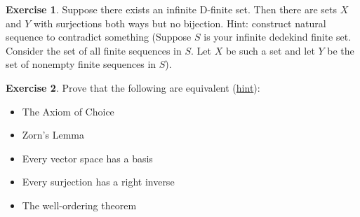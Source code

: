 \documentclass{article}
\theoremstyle{definition}
\newtheorem{exer}{Exercise}[section]
\begin{document}
\begin{exer}
    Suppose there exists an infinite D-finite set. Then there are sets $X$ and $Y$ with surjections both ways but no bijection. Hint: construct natural sequence to contradict something (Suppose $S$ is your infinite dedekind finite set. Consider the set of all finite sequences in $S$. Let $X$ be such a set and let $Y$ be the set of nonempty finite sequences in $S$).
\end{exer}

\begin{exer}
    Prove that the following are equivalent (\href{https://dept.math.lsa.umich.edu/~ablass/bases-AC.pdf}{hint}):
    \begin{itemize}
        \item The Axiom of Choice
        \item Zorn's Lemma
        \item Every vector space has a basis
        \item Every surjection has a right inverse
        \item The well-ordering theorem 
    \end{itemize}
\end{exer}
\end{document}
